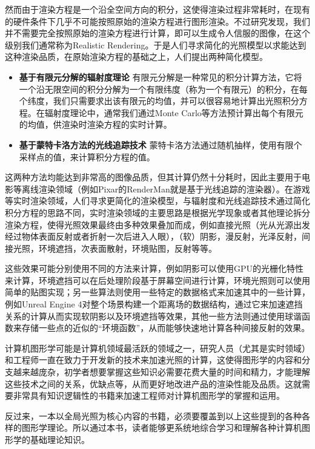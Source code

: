 然而由于渲染方程是一个沿全空间方向的积分，这使得渲染过程非常耗时，在现有的硬件条件下几乎不可能按照原始的渲染方程进行图形渲染。不过研究发现，我们并不需要完全按照原始的渲染方程进行计算，即可以生成令人信服的图像，在这个级别我们通常称为Realistic Rendering。于是人们寻求简化的光照模型以求能达到这种渲染品质，在原始渲染方程的基础之上，人们提出两种简化模型。

\begin{itemize}
	\item \textbf{基于有限元分解的辐射度理论 } 有限元分解是一种常见的积分计算方法，它将一个沿无限空间的积分分解为一个有限纬度（称为一个有限元）的积分，在每个纬度，我们只需要求出该有限元的均值，并可以很容易地计算出光照积分方程。在辐射度理论中，通常我们通过Monte Carlo等方法预计算出每个有限元的均值，供渲染时渲染方程的实时计算。
	\item \textbf{基于蒙特卡洛方法的光线追踪技术 } 蒙特卡洛方法通过随机抽样，使用有限个采样点的值，来计算积分方程的值。
\end{itemize}

这两种方法均能达到非常高的图像品质，但其计算仍然十分耗时，因此主要用于电影等离线渲染领域（例如Pixar的RenderMan就是基于光线追踪的渲染器）。在游戏等实时渲染领域，人们寻求更简化的渲染模型，与辐射度和光线追踪技术通过简化积分方程的思路不同，实时渲染领域的主要思路是根据光学现象或者其他理论拆分渲染方程，使得光照效果最终由多种效果叠加而成，例如直接光照（光从光源出发经过物体表面反射或者折射一次后进入人眼），（软）阴影，漫反射，光泽反射，间接光照，环境遮挡，次表面散射，环境贴图，反射等等。

这些效果可能分别使用不同的方法来计算，例如阴影可以使用GPU的光栅化特性来计算，环境遮挡可以在后处理阶段基于屏幕空间进行计算，环境光照则可以使用简单的贴图实现；另一些算法则使用一些特定的数据格式来加速其中的一些计算，例如Unreal Engine 4对整个场景构建一个距离场的数据结构，通过它来加速遮挡关系的计算从而实现软阴影以及环境遮挡等效果，其他一些方法则通过使用球谐函数来存储一些点的近似的“环境函数”，从而能够快速地计算各种间接反射的效果。

计算机图形学可能是计算机领域最活跃的领域之一，研究人员（尤其是实时领域）和工程师一直在致力于开发新的技术来加速光照的计算，这使得图形学的内容和分支越来越庞杂，初学者想要掌握这些知识必需要花费大量的时间和精力，才能理解这些技术之间的关系，优缺点等，从而更好地改进产品的渲染性能及品质。这就需要非常具有知识逻辑性的书籍来加速工程师对计算机图形学的掌握和运用。

反过来，一本以全局光照为核心内容的书籍，必须要覆盖到以上这些提到的各种各样的图形学理论。所以通过本书，读者能够更系统地综合学习和理解各种计算机图形学的基础理论知识。



